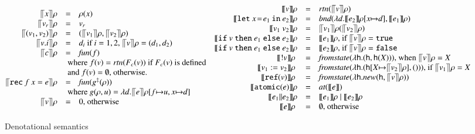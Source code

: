 \documentclass[nocopyrightspace,preprint]{sigplanconf}
\newcommand{\keywd}[1]{\mathtt{#1}}
\newcommand{\myread}[1]{!{#1}}
\newcommand{\myref}[1]{\keywd{ref}(#1)}
\newcommand{\funn}[1]{\textit{fun}(#1)}
\newcommand{\mtrue}{\keywd{true}}
\newcommand{\mfalse}{\keywd{false}}
\newcommand{\vfix}[3]{\keywd{rec}\:{#1}\:{#2} = {#3}}
\newcommand{\letin}[2]{\keywd{let}\:{#1}\!=\!{#2}\:\keywd{in}\:}
\newcommand{\assign}[2]{{#1}:={#2}}
\newcommand{\myif}[3]{\keywd{if}\ #1\ \keywd{then}\ #2\
  \keywd{else}\ #3}
\newcommand{\myatomic}[1]{\keywd{atomic}(#1)}
\newcommand{\mypar}[2]{#1 \| #2}
\newcommand{\semparallel}{~|~}
\newcommand{\semC}[1]{\ensuremath{\llbracket {#1} \rrbracket}}
\newcommand{\semV}[1]{\ensuremath{\llceil {#1} \rrceil
}}
\newcommand{\cloc}{\ensuremath{X}\xspace}
\newcommand\heap{\ensuremath{\mathsf{h}}\xspace}
\begin{document}
\begin{figure*}[tph]
\vspace{-10mm}
\[
\begin{array}{@{}rcl}
 \semV{x}\rho &=& \rho(x)\\
\semV{v_r}\rho &=& v_r\\
\semV{(v_1,v_2)}\rho &=& (\semV{v_1}\rho,\semV{v_2}\rho)\\
\semV{v.i}\rho &=& d_i\ \mbox{if $i=1,2$, $\semV{v}\rho = (d_1,d_2)$}\\
\semV{c}\rho &=& \funn f\\
&\multicolumn{2}{l}{\mbox{ where
  $f(v)=\textit{rtn}(F_c(v))$ if $F_c(v)$ is defined}}
  \\ & \multicolumn{2}{l}{\textrm{  and $f(v)=\emptyset$, otherwise.}}
\\
\semV{\vfix{f}{x}e}\rho &=& \funn
{g^\ddagger(\rho)}\\&\multicolumn{2}{l}{\mbox{ where
  $g(\rho,u)=\lambda d.\semV{e}\rho[f{\mapsto}u,x{\mapsto}d]$}}
\\
\semV{v}\rho &=& 0\mbox{, otherwise}
\end{array}
\begin{array}{rcl}
 \semC{v}\rho&=&\textit{rtn}(\semV{v}\rho)\\
\semC{\letin{x}{e_1}{e_2}}\rho &=& \textit{bnd}(\lambda d.\semC{e_2}\rho[x{\mapsto}d],\semC{e_1}\rho)\\
\semC{v_1\ v_2}\rho &=& \semV{v_1}\rho(\semV{v_2}\rho)\\
\semC{\myif{v}{e_1}{e_2}}\rho &=& \semC{e_1}\rho\mbox{, if }\semV{v}\rho=\mtrue\\  
\semC{\myif{v}{e_1}{e_2}}\rho &=& \semC{e_2}\rho\mbox{, if }\semV{v}\rho=\mfalse\\ 
\semC{\myread{v}}\rho\  &=& \textit{fromstate}(\lambda \heap.(\heap,\heap(\cloc)))\mbox{, when
$\semV{v}\rho=\cloc$}\\
\semC{\assign{v_1}{v_2}}\rho\  &=&\textit{fromstate}(\lambda \heap.
(\heap[\cloc{\mapsto}\semV{v_2}\rho],()))\mbox{, if $\semV{v_1}\rho=
\cloc$}\\
\semC{\myref{v}}\rho\  &=& \textit{fromstate}(\lambda \heap.\textit{new}(\heap,\semV{v}\rho))\\
\semC{\myatomic{e}}\rho &=& \textit{at}(\semC{e})\\
\semC{\mypar{e_1}{e_2}}\rho &=& \semC{e_1}\rho\semparallel \semC{e_2}\rho\\
\semC{e}\rho\ &=& \emptyset \mbox{, otherwise}
\end{array}
\]
\caption{Denotational semantics \label{seme}}
\end{figure*}
\end{document}
